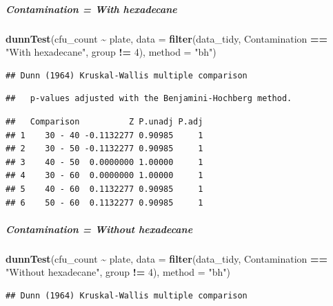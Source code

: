\documentclass[
]{article}
\newenvironment{Shaded}{\begin{snugshade}}{\end{snugshade}}
\newcommand{\AttributeTok}[1]{\textcolor[rgb]{0.13,0.29,0.53}{#1}}
\newcommand{\DecValTok}[1]{\textcolor[rgb]{0.00,0.00,0.81}{#1}}
\newcommand{\FunctionTok}[1]{\textcolor[rgb]{0.13,0.29,0.53}{\textbf{#1}}}
\newcommand{\NormalTok}[1]{#1}
\newcommand{\SpecialCharTok}[1]{\textcolor[rgb]{0.81,0.36,0.00}{\textbf{#1}}}
\newcommand{\StringTok}[1]{\textcolor[rgb]{0.31,0.60,0.02}{#1}}
\begin{document}
\subparagraph{Contamination = With
hexadecane}\label{contamination-with-hexadecane}

\subparagraph{}\label{section-1}

\begin{Shaded}
\begin{Highlighting}[]
\FunctionTok{dunnTest}\NormalTok{(cfu\_count }\SpecialCharTok{\textasciitilde{}}\NormalTok{ plate, }\AttributeTok{data =} \FunctionTok{filter}\NormalTok{(data\_tidy, Contamination }\SpecialCharTok{==} \StringTok{"With hexadecane"}\NormalTok{, group }\SpecialCharTok{!=} \DecValTok{4}\NormalTok{), }\AttributeTok{method =} \StringTok{"bh"}\NormalTok{)}
\end{Highlighting}
\end{Shaded}

\begin{verbatim}
## Dunn (1964) Kruskal-Wallis multiple comparison
\end{verbatim}

\begin{verbatim}
##   p-values adjusted with the Benjamini-Hochberg method.
\end{verbatim}

\begin{verbatim}
##   Comparison          Z P.unadj P.adj
## 1    30 - 40 -0.1132277 0.90985     1
## 2    30 - 50 -0.1132277 0.90985     1
## 3    40 - 50  0.0000000 1.00000     1
## 4    30 - 60  0.0000000 1.00000     1
## 5    40 - 60  0.1132277 0.90985     1
## 6    50 - 60  0.1132277 0.90985     1
\end{verbatim}

\subparagraph{Contamination = Without
hexadecane}\label{contamination-without-hexadecane}

\subparagraph{}\label{section-2}

\begin{Shaded}
\begin{Highlighting}[]
\FunctionTok{dunnTest}\NormalTok{(cfu\_count }\SpecialCharTok{\textasciitilde{}}\NormalTok{ plate, }\AttributeTok{data =} \FunctionTok{filter}\NormalTok{(data\_tidy, Contamination }\SpecialCharTok{==} \StringTok{"Without hexadecane"}\NormalTok{, group }\SpecialCharTok{!=} \DecValTok{4}\NormalTok{), }\AttributeTok{method =} \StringTok{"bh"}\NormalTok{)}
\end{Highlighting}
\end{Shaded}

\begin{verbatim}
## Dunn (1964) Kruskal-Wallis multiple comparison
\end{verbatim}
\end{document}
